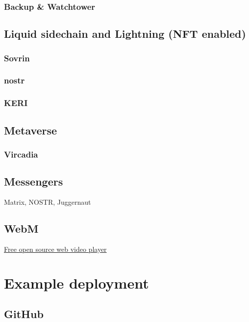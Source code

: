 \lipsum[50]
\subsection{Backup \& Watchtower}
\lipsum[50]
\section{Liquid sidechain and Lightning (NFT enabled)}
\lipsum[50]





\lipsum[50]
\subsection{Sovrin}
\lipsum[50]
\subsection{nostr}
\lipsum[50]
\subsection{KERI}
\lipsum[50]
\section{Metaverse}
\lipsum[50]
\subsection{Vircadia}
\lipsum[50]
\section{Messengers}
Matrix, NOSTR, Juggernaut
\section{WebM}
\href{https://www.webmproject.org/about/}{Free open source web video player}
	
\lipsum[50]
\chapter{Example deployment }
\lipsum[50]
\section{GitHub }
\lipsum[50]